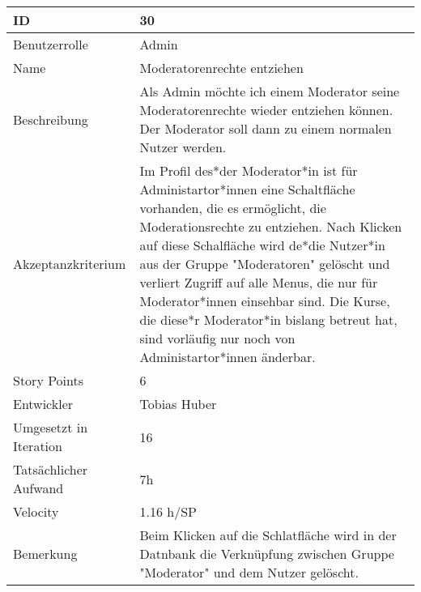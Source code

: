 \begin{tabularx}{\textwidth}{|p{}|X|}
	\hline
	ID & 30 \\
	\hline
	Benutzerrolle & Admin \\
	\hline
	Name & Moderatorenrechte entziehen\\
	\hline
	Beschreibung & Als Admin möchte ich einem Moderator seine Moderatorenrechte wieder entziehen können. Der Moderator soll dann zu einem normalen Nutzer werden. \\
	\hline
	Akzeptanzkriterium & Im Profil des*der Moderator*in ist für Administartor*innen eine Schaltfläche vorhanden, die es ermöglicht, die Moderationsrechte zu entziehen. Nach Klicken auf diese Schalfläche wird de*die Nutzer*in aus der Gruppe "Moderatoren" gelöscht und verliert Zugriff auf alle Menus, die nur für Moderator*innen einsehbar sind. Die Kurse, die diese*r Moderator*in bislang betreut hat, sind vorläufig nur noch von Administartor*innen änderbar. \\
	\hline
	Story Points & 6 \\
	\hline
	Entwickler & Tobias Huber \\
	\hline
	Umgesetzt in Iteration & 16\\
	\hline
	Tatsächlicher Aufwand & 7h\\
	\hline
	Velocity & 1.16 h/SP \\
	\hline
	Bemerkung & Beim Klicken auf die Schlatfläche wird in der Datnbank die Verknüpfung zwischen Gruppe "Moderator" und dem Nutzer gelöscht.\\
	\hline
\end{tabularx}
\vspace{20pt}
